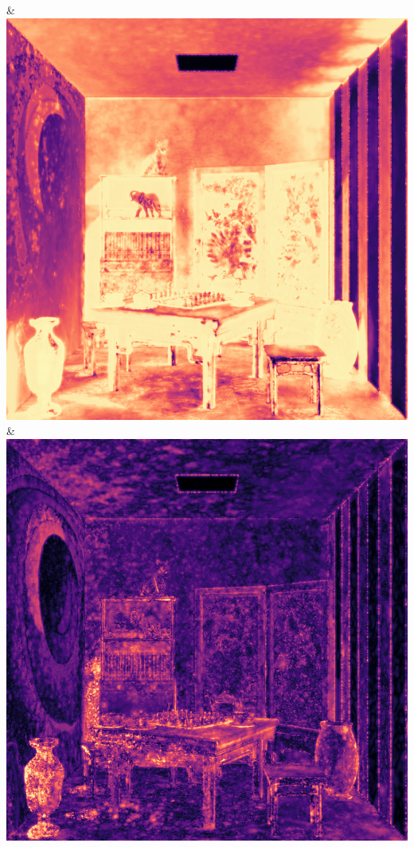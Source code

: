 & \includegraphics[width=\linewidth]{figures/py/tests/quality_comparison/nrc+lt+bal_1spp_chess_flip.png}
& \includegraphics[width=\linewidth]{figures/py/tests/quality_comparison/nrc+sppc_1spp_chess_flip.png}
